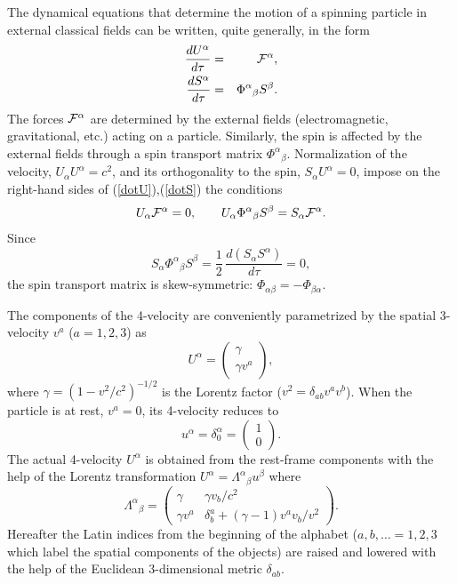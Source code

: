 \documentclass[preprint,showpacs,preprintnumbers,amsmath,amssymb]{revtex4}
\begin{document}
The dynamical equations that determine the motion of a spinning particle
in external classical fields can be written, quite generally, in the form
\begin{eqnarray}
{\frac {dU^\alpha}{d\tau}} &=& {\cal F}^\alpha,\label{dotU}\\
{\frac {dS^\alpha}{d\tau}} &=& \Phi^\alpha{}_\beta S^\beta.\label{dotS}
\end{eqnarray}
The forces ${\cal F}^\alpha$ are determined by the external fields
(electromagnetic, gravitational, etc.) acting on a particle. Similarly,
the spin is affected by the external fields through a spin transport
matrix $\Phi^\alpha{}_\beta$. Normalization of the velocity, $U_{\alpha}
U^\alpha = c^2$, and its orthogonality to the spin, $S_{\alpha}U^\alpha = 0$,
impose on the right-hand sides of (\ref{dotU}),(\ref{dotS}) the conditions
\begin{equation}
U_\alpha {\cal F}^\alpha = 0,\qquad U_\alpha\Phi^\alpha{}_\beta S^\beta =
S_\alpha {\cal F}^\alpha.\label{cc}
\end{equation}
Since
\begin{equation}
S_\alpha\Phi^\alpha{}_\beta S^\beta={\frac 12}\,{\frac{d(S_\alpha S^\alpha)}
{d\tau}}=0,
\end{equation}
the spin transport matrix is skew-symmetric: $\Phi_{\alpha\beta}=-\Phi_{\beta\alpha}$.

The components of the 4-velocity are conveniently parametrized by the spatial
3-velocity $v^a$ ($a = 1,2,3$) as
\begin{equation}\label{U}
U^\alpha = \left(\begin{array}{c}\gamma \\ \gamma v^a\end{array}\right),
\end{equation}
where $\gamma = (1 - v^2/c^2)^{-1/2}$ is the Lorentz factor ($v^2 = \delta_{ab}
v^av^b$). When the particle is at rest, $v^a =0$, its 4-velocity reduces to
\begin{equation}\label{Ur}
u^\alpha = \delta^\alpha_0 = \left(\begin{array}{c}1 \\ 0\end{array}\right).
\end{equation}
The actual 4-velocity $U^\alpha$ is obtained from the rest-frame components
with the help of the Lorentz transformation $U^\alpha = \Lambda^\alpha{}_\beta
u^\beta$ where
\begin{equation}\label{Lambda}
\Lambda^\alpha{}_\beta = \left(\begin{array}{c|c}\gamma & \gamma v_b/c^2 \\
\hline \gamma v^a & \delta^a_b + (\gamma - 1)v^av_b/v^2\end{array}\right).
\end{equation}
Hereafter the Latin indices from the beginning of the alphabet ($a,b,\dots
= 1,2,3$ which label the spatial components of the objects) are raised and
lowered with the help of the Euclidean 3-dimensional metric $\delta_{ab}$.
\end{document}
